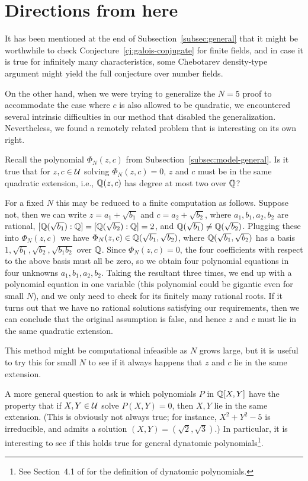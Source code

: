 \section{Directions from here}
\label{sec:map}

It has been mentioned at the end of Subsection~\ref{subsec:general}
that it might be worthwhile to check
Conjecture~\ref{cj:galois-conjugate} for finite fields, and in case it
is true for infinitely many characteristics, some Chebotarev
density-type argument might yield the full conjecture over number
fields.

On the other hand, when we were trying to generalize the $N = 5$ proof
to accommodate the case where $c$ is also allowed to be quadratic, we
encountered several intrinsic difficulties in our method that disabled
the generalization. Nevertheless, we found a remotely related problem
that is interesting on its own right.

\begin{question}
  \label{q:z-c-same-extension}
  Recall the polynomial $\Phi_N(z, c)$ from
  Subsection~\ref{subsec:model-general}. Is it true that for $z, c \in
  \mathcal{U}$ solving $\Phi_N(z, c) = 0$, $z$ and $c$ must be in the same
  quadratic extension, i.e., $\mathbb{Q}(z, c)$ has degree at most two over
  $\mathbb{Q}$?
\end{question}

For a fixed $N$ this may be reduced to a finite computation as
follows. Suppose not, then we can write $z = a_1 + \sqrt{b_1}$ and $c
= a_2 + \sqrt{b_2}$, where $a_1, b_1, a_2, b_2$ are rational,
$[\mathbb{Q}(\sqrt{b_1}) : \mathbb{Q}] = [\mathbb{Q}(\sqrt{b_2}) : \mathbb{Q}] = 2$, and
$\mathbb{Q}(\sqrt{b_1}) \ne \mathbb{Q}(\sqrt{b_2})$. Plugging these into $\Phi_N(z,
c)$ we have $\Phi_N(z, c) \in \mathbb{Q}(\sqrt{b_1}, \sqrt{b_2})$, where
$\mathbb{Q}(\sqrt{b_1}, \sqrt{b_2})$ has a basis $1, \sqrt{b_1}, \sqrt{b_2},
\sqrt{b_1 b_2}$ over $\mathbb{Q}$. Since $\Phi_N(z, c) = 0$, the four
coefficients with respect to the above basis must all be zero, so we
obtain four polynomial equations in four unknowns $a_1, b_1, a_2,
b_2$. Taking the resultant three times, we end up with a polynomial
equation in one variable (this polynomial could be gigantic even for
small $N$), and we only need to check for its finitely many rational
roots. If it turns out that we have no rational solutions satisfying
our requirements, then we can conclude that the original assumption is
false, and hence $z$ and $c$ must lie in the same quadratic extension.

This method might be computational infeasible as $N$
grows large, but it is useful to try this for small $N$ to see if it
always happens that $z$ and $c$ lie in the same extension.

A more general question to ask is which polynomials $P$ in $\mathbb{Q}[X, Y]$
have the property that if $X, Y \in \mathcal{U}$ solve $P(X, Y) = 0$, then $X,
Y$ lie in the same extension. (This is obviously not always true; for
instance, $X^2 + Y^2 - 5$ is irreducible, and admits a solution $(X,
Y) = (\sqrt{2}, \sqrt{3})$.) In particular, it is interesting to see
if this holds true for general dynatomic polynomials\footnote{%
  See Section~4.1 of \cite{MR2316407} for the definition of dynatomic
  polynomials.}.


